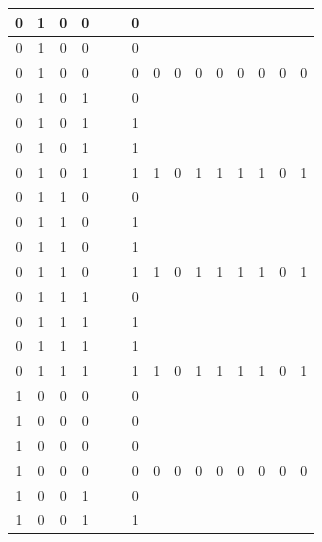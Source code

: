 \begin{table}[!tb]
\begin{tabular}{|c|c|c|c|c|c|c|c|c|c|c|c|c|c|c|}
        \rowcolor{yellow!40} 0 & 1 & 0 & 0 &  &  & 0 &  &  &  &  &  &  &  &  \\ \hline
        \rowcolor{yellow!40} 0 & 1 & 0 & 0 &  &  & 0 &  &  &  &  &  &  &  &  \\ \hline
        \rowcolor{yellow!40} 0 & 1 & 0 & 0 &  &  & 0 & 0 & 0 & 0 & 0 & 0 & 0 & 0 & 0 \\ \hline
        \rowcolor{gray!40} 0 & 1 & 0 & 1 &  &  & 0 &  &  &  &  &  &  &  &  \\ \hline
        \rowcolor{gray!40} 0 & 1 & 0 & 1 &  &  & 1 &  &  &  &  &  &  &  &  \\ \hline
        \rowcolor{gray!40} 0 & 1 & 0 & 1 &  &  & 1 &  &  &  &  &  &  &  &  \\ \hline
        \rowcolor{gray!40} 0 & 1 & 0 & 1 &  &  & 1 & 1 & 0 & 1 & 1 & 1 & 1 & 0 & 1 \\ \hline
        \rowcolor{blue!40} 0 & 1 & 1 & 0 &  &  & 0 &  &  &  &  &  &  &  &  \\ \hline
        \rowcolor{blue!40} 0 & 1 & 1 & 0 &  &  & 1 &  &  &  &  &  &  &  &  \\ \hline
        \rowcolor{blue!40} 0 & 1 & 1 & 0 &  &  & 1 &  &  &  &  &  &  &  &  \\ \hline
        \rowcolor{blue!40} 0 & 1 & 1 & 0 &  &  & 1 & 1 & 0 & 1 & 1 & 1 & 1 & 0 & 1 \\ \hline
        \rowcolor{red!40} 0 & 1 & 1 & 1 &  &  & 0 &  &  &  &  &  &  &  &  \\ \hline
        \rowcolor{red!40} 0 & 1 & 1 & 1 &  &  & 1 &  &  &  &  &  &  &  &  \\ \hline
        \rowcolor{red!40} 0 & 1 & 1 & 1 &  &  & 1 &  &  &  &  &  &  &  &  \\ \hline
        \rowcolor{red!40} 0 & 1 & 1 & 1 &  &  & 1 & 1 & 0 & 1 & 1 & 1 & 1 & 0 & 1 \\ \hline
        \rowcolor{green!40} 1 & 0 & 0 & 0 &  &  & 0 &  &  &  &  &  &  &  &  \\ \hline
        \rowcolor{green!40} 1 & 0 & 0 & 0 &  &  & 0 &  &  &  &  &  &  &  &  \\ \hline
        \rowcolor{green!40} 1 & 0 & 0 & 0 &  &  & 0 &  &  &  &  &  &  &  &  \\ \hline
        \rowcolor{green!40} 1 & 0 & 0 & 0 &  &  & 0 & 0 & 0 & 0 & 0 & 0 & 0 & 0 & 0 \\ \hline
        \rowcolor{yellow!40} 1 & 0 & 0 & 1 &  &  & 0 &  &  &  &  &  &  &  &  \\ \hline
        \rowcolor{yellow!40} 1 & 0 & 0 & 1 &  &  & 1 &  &  &  &  &  &  &  &  \\ \hline

\end{tabular}
\end{table}
